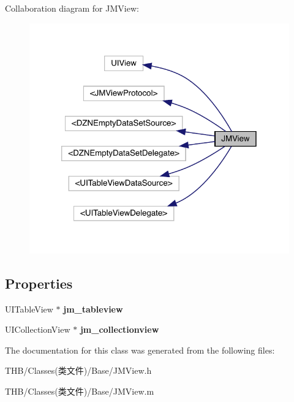 Collaboration diagram for J\+M\+View\+:\nopagebreak
\begin{figure}[H]
\begin{center}
\leavevmode
\includegraphics[width=320pt]{interface_j_m_view__coll__graph}
\end{center}
\end{figure}
\subsection*{Properties}
\begin{DoxyCompactItemize}
\item 
\mbox{\label{interface_j_m_view_a264423eb6717d01ce6c0161f3a696bd9}} 
U\+I\+Table\+View $\ast$ {\bfseries jm\+\_\+tableview}
\item 
\mbox{\label{interface_j_m_view_a3775fea43aac728ced01fb1b8a4fe92a}} 
U\+I\+Collection\+View $\ast$ {\bfseries jm\+\_\+collectionview}
\end{DoxyCompactItemize}


The documentation for this class was generated from the following files\+:\begin{DoxyCompactItemize}
\item 
T\+H\+B/\+Classes(类文件)/\+Base/J\+M\+View.\+h\item 
T\+H\+B/\+Classes(类文件)/\+Base/J\+M\+View.\+m\end{DoxyCompactItemize}
